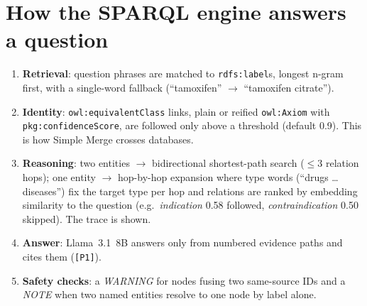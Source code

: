 \documentclass[10pt,a4paper]{article}
\newcommand{\code}[1]{\texttt{\small #1}}
\begin{document}
\section{How the SPARQL engine answers a question}
\begin{enumerate}
\item \textbf{Retrieval}: question phrases are matched to \code{rdfs:label}s, longest n-gram first, with a single-word fallback (``tamoxifen'' $\rightarrow$ ``tamoxifen citrate'').
\item \textbf{Identity}: \code{owl:equivalentClass} links, plain or reified \code{owl:Axiom} with \code{pkg:confidenceScore}, are followed only above a threshold (default 0.9). This is how Simple Merge crosses databases.
\item \textbf{Reasoning}: two entities $\rightarrow$ bidirectional shortest-path search ($\le$3 relation hops); one entity $\rightarrow$ hop-by-hop expansion where type words (``drugs \ldots diseases'') fix the target type per hop and relations are ranked by embedding similarity to the question (e.g.\ \emph{indication} 0.58 followed, \emph{contraindication} 0.50 skipped). The trace is shown.
\item \textbf{Answer}: Llama~3.1~8B answers only from numbered evidence paths and cites them (\code{[P1]}).
\item \textbf{Safety checks}: a \emph{WARNING} for nodes fusing two same-source IDs and a \emph{NOTE} when two named entities resolve to one node by label alone.
\end{enumerate}
\end{document}
